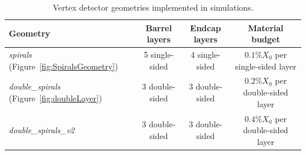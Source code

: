 \begin{table}[htbp]
  \caption{Vertex detector geometries implemented in simulations.}
  \begin{center}
    \begin{tabular}{ l c c c }
      \hline
      Geometry & Barrel layers & Endcap layers & Material budget \\ \hline \hline
      \emph{spirals} (Figure~\ref{fig:SpiralsGeometry}) & 5 single-sided & 4 single-sided & $0.1\%X_{0}$ per single-sided layer  \\ %
      \emph{double\_spirals} (Figure~\ref{fig:doubleLayer}) & 3 double-sided & 3 double-sided & $0.2\%X_{0}$ per double-sided layer  \\ %
      \emph{double\_spirals\_v2} & 3 double-sided & 3 double-sided & $0.4\%X_{0}$ per double-sided layer  \\ \hline  
    \end{tabular}
  \end{center}
  \label{tab:geometries}
\end{table}


